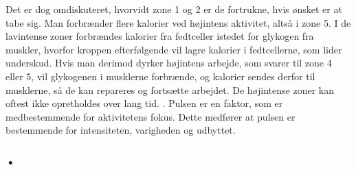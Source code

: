 Det er dog omdiskuteret, hvorvidt zone 1 og 2 er de fortrukne, hvis ønsket er at tabe sig. Man forbrænder flere kalorier ved højintens aktivitet, altså i zone 5. I de lavintense zoner forbrændes kalorier fra fedtceller istedet for glykogen fra muskler, hvorfor kroppen efterfølgende vil lagre kalorier i fedtcellerne, som lider underskud. Hvis man derimod dyrker højintens arbejde, som svarer til zone 4 eller 5, vil glykogenen i musklerne forbrænde, og kalorier sendes derfor til musklerne, så de kan repareres og fortsætte arbejdet. De højintense zoner kan oftest ikke opretholdes over lang tid. 
\citep{Martini2012,Leyland2007,Heartratejournal2015}. \newline
Pulsen er en faktor, som er medbestemmende for aktivitetens fokus. Dette medfører at pulsen er bestemmende for intensiteten, varigheden og udbyttet.

\subsubsection{•}



%
%
